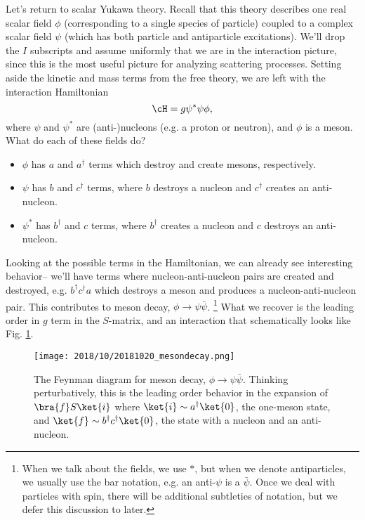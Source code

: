Let's return to scalar Yukawa theory. Recall that this theory describes one real scalar field $\phi$ (corresponding to a single species of particle) coupled to a complex scalar field $\psi$ (which has both particle and antiparticle excitations). We'll drop the $I$ subscripts and assume uniformly that we are in the interaction picture, since this is the most useful picture for analyzing scattering processes. Setting aside the kinetic and mass terms from the free theory, we are left with the interaction Hamiltonian
$$\cH = g \psi^* \psi \phi,$$
where $\psi$ and $\psi^*$ are (anti-)nucleons (e.g. a proton or neutron), and $\phi$ is a meson. What do each of these fields do?
\begin{itemize}
    \item $\phi$ has $a$ and $a^\dagger$ terms which destroy and create mesons, respectively.
    \item $\psi$ has $b$ and $c^\dagger$ terms, where $b$ destroys a nucleon and $c^\dagger$ creates an anti-nucleon.
    \item $\psi^*$ has $b^\dagger$ and $c$ terms, where $b^\dagger$ creates a nucleon and $c$ destroys an anti-nucleon.
\end{itemize}
Looking at the possible terms in the Hamiltonian, we can already see interesting behavior-- we'll have terms where nucleon-anti-nucleon pairs are created and destroyed, e.g. $b^\dagger c^\dagger a$ which destroys a meson and produces a nucleon-anti-nucleon pair. This contributes to meson decay, $\phi\to \psi\bar \psi$.%
    \footnote{When we talk about the fields, we use $*$, but when we denote antiparticles, we usually use the bar notation, e.g. an anti-$\psi$ is a $\bar \psi$. Once we deal with particles with spin, there will be additional subtleties of notation, but we defer this discussion to later.} 
What we recover is the leading order in $g$ term in the $S$-matrix, and an interaction that schematically looks like Fig. \ref{fig:mesondecay1}.

\begin{figure}
    \centering
    \texttt{[image: 2018/10/20181020\_mesondecay.png]}
    \caption{The Feynman diagram for meson decay, $\phi\to \psi\bar \psi$. Thinking perturbatively, this is the leading order behavior in the expansion of $\bra{f}S\ket{i}$ where $\ket{i}\sim a^\dagger \ket{0}$, the one-meson state, and $\ket{f}\sim b^\dagger c^\dagger \ket{0}$, the state with a nucleon and an anti-nucleon.}
    \label{fig:mesondecay1}
\end{figure}

